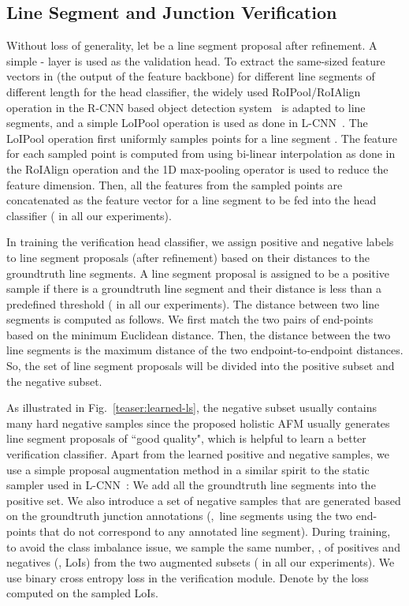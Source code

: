 \documentclass[10pt,twocolumn,letterpaper]{article}
\begin{document}
\subsection{Line Segment and Junction Verification}\label{sec:verification}
\vspace{-2mm}
Without loss of generality, let  be a line segment proposal after refinement. A simple - layer is used as the validation head. To extract the same-sized feature vectors in  (the output of the feature backbone) for different line segments of different length for the head classifier, the widely used RoIPool/RoIAlign operation in the R-CNN based object detection system~\cite{fastRCNN, fasterrcnn} is adapted to line segments, and a simple LoIPool operation is used as done in L-CNN~\cite{ZhouQM19}. The LoIPool operation first uniformly samples  points for a line segment . The feature for each sampled point is computed from  using bi-linear interpolation as done in the RoIAlign operation and the 1D max-pooling operator is used to reduce the feature dimension. Then, all the features from the  sampled points are concatenated as the feature vector for a line segment to be fed into the head classifier ( in all our experiments).

In training the verification head classifier, we assign positive and negative labels to line segment proposals (after refinement) based on their distances to the groundtruth line segments. A line segment proposal is assigned to be a positive sample if there is a groundtruth line segment and their distance is less than a predefined threshold  ( in all our experiments). The distance between two line segments is computed as follows. We first match the two pairs of end-points based on the minimum Euclidean distance. Then, the distance between the two line segments is the maximum distance of the two endpoint-to-endpoint distances. So, the set of line segment proposals will be divided into the positive subset and the negative subset. 


As illustrated in Fig.~\ref{teaser:learned-ls}, the negative subset usually contains many hard negative samples since the proposed holistic AFM usually generates line segment proposals of ``good quality", which is helpful to learn a better verification classifier. Apart from the learned positive and negative samples, we use a simple proposal augmentation method in a similar spirit to the static sampler used in L-CNN~\cite{ZhouQM19}: We add all the groundtruth line segments into the positive set. We also introduce a set of negative samples that are generated based on the groundtruth junction annotations (\ie,~line segments using the two end-points that do not correspond to any annotated line segment). 
During training, to avoid the class imbalance issue, we sample the same number, , of positives and negatives (\ie, LoIs) from the two augmented subsets ( in all our experiments).    
We use binary cross entropy loss in the verification module. Denote by  the loss computed on the sampled LoIs.  
\end{document}
